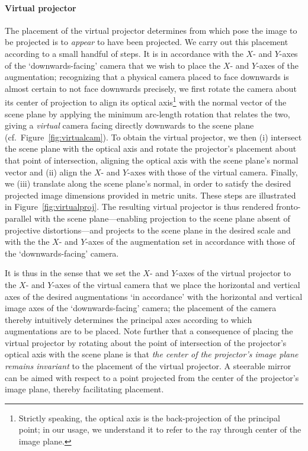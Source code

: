 \documentclass[review]{elsarticle}
\begin{document}
\paragraph{Virtual projector} The placement of the virtual projector determines from which pose the image to be projected is to \textit{appear} to have been projected.  We carry out this placement according to a small handful of steps. It is in accordance with the $X$- and $Y$-axes of the `downwards-facing' camera that we wish to place the $X$- and $Y$-axes of the augmentation; recognizing that a physical camera placed to face downwards is almost certain to not face downwards precisely, we first rotate the camera about its center of projection to align its optical axis\footnote{Strictly speaking, the optical axis is the back-projection of the principal point; in our usage, we understand it to refer to the ray through center of the image plane.} with the normal vector of the scene plane by applying the minimum arc-length rotation that relates the two, giving a \textit{virtual} camera facing directly downwards to the scene plane (cf.\ Figure~\ref{fig:virtualcam}). To obtain the virtual projector, we then (i) intersect the scene plane with the optical axis and rotate the projector's placement about that point of intersection, aligning the optical axis with the scene plane's normal vector and (ii) align the $X$- and $Y$-axes with those of the virtual camera. Finally, we (iii) translate along the scene plane's normal, in order to satisfy the desired projected image dimensions provided in metric units. These steps are illustrated in Figure~\ref{fig:virtualproj}. The resulting virtual projector is thus rendered fronto-parallel with the scene plane---enabling projection to the scene plane absent of projective distortions---and projects to the scene plane in the desired scale and with the the $X$- and $Y$-axes of the augmentation set in accordance with those of the `downwards-facing' camera. %

It is thus in the sense that we set the $X$- and $Y$-axes of the virtual projector to the $X$- and $Y$-axes of the virtual camera that we place the horizontal and vertical axes of the desired augmentations `in accordance' with the horizontal and vertical image axes of the `downwards-facing' camera; the placement of the camera thereby intuitively determines the principal axes according to which augmentations are to be placed. Note further that a consequence of placing the virtual projector by rotating about the point of intersection of the projector's optical axis with the scene plane is that \textit{the center of the projector's image plane remains invariant} to the placement of the virtual projector. A steerable mirror can be aimed with respect to a point projected from the center of the projector's image plane, thereby facilitating placement.
\end{document}
